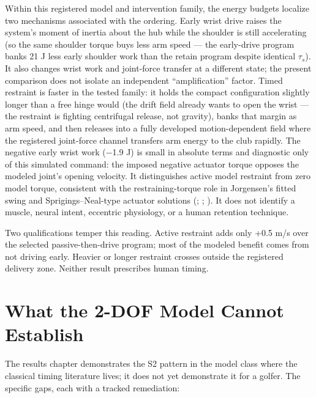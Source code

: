 \documentclass[
  letterpaper,
]{report}
\begin{document}
Within this registered model and intervention family, the energy budgets
localize two mechanisms associated with the ordering. Early wrist drive
raises the system's moment of inertia about the hub while the shoulder
is still accelerating (so the same shoulder torque buys less arm speed
--- the early-drive program banks 21 J less early shoulder work than the
retain program despite identical \(\tau_s\)). It also changes wrist work
and joint-force transfer at a different state; the present comparison
does not isolate an independent ``amplification'' factor. Timed
restraint is faster in the tested family: it holds the compact
configuration slightly longer than a free hinge would (the drift field
already wants to open the wrist --- the restraint is fighting
centrifugal release, not gravity), banks that margin as arm speed, and
then releases into a fully developed motion-dependent field where the
registered joint-force channel transfers arm energy to the club rapidly.
The negative early wrist work (−1.9 J) is small in absolute terms and
diagnostic only of this simulated command: the imposed negative actuator
torque opposes the modeled joint's opening velocity. It distinguishes
active model restraint from zero model torque, consistent with the
restraining-torque role in Jorgensen's fitted swing and
Sprigings--Neal-type actuator solutions (; ; ). It does
not identify a muscle, neural intent, eccentric physiology, or a human
retention technique.

Two qualifications temper this reading. Active restraint adds only +0.5
m/s over the selected passive-then-drive program; most of the modeled
benefit comes from not driving early. Heavier or longer restraint
crosses outside the registered delivery zone. Neither result prescribes
human timing.

\section{What the 2-DOF Model Cannot
Establish}\label{sec-discussion-limits}

The results chapter demonstrates the S2 pattern in the model class where
the classical timing literature lives; it does not yet demonstrate it
for a golfer. The specific gaps, each with a tracked remediation:
\end{document}
